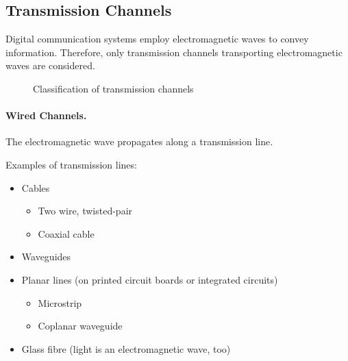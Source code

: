 \begin{refsection}
\subsection{Transmission Channels}

Digital communication systems employ electromagnetic waves to convey information. Therefore, only transmission channels transporting electromagnetic waves are considered.

\begin{figure}[H]
	\centering
	\caption{Classification of transmission channels}
	\label{fig:ch01:trans_ch_classif}
\end{figure}

\paragraph{Wired Channels.}

The electromagnetic wave propagates along a transmission line.

Examples of transmission lines:
\begin{itemize}
	\item Cables
	\begin{itemize}
		\item Two wire, twisted-pair 
		\item Coaxial cable 
	\end{itemize}
	\item Waveguides 
	\item Planar lines (on printed circuit boards or integrated circuits)
	\begin{itemize}
		\item Microstrip 
		\item Coplanar waveguide 
	\end{itemize}
	\item Glass fibre (light is an electromagnetic wave, too)
\end{itemize}


\end{refsection}
